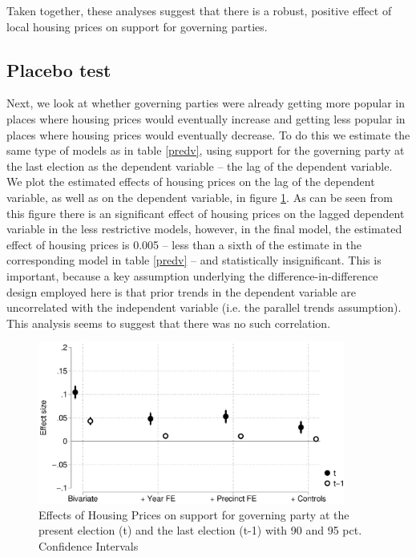 \documentclass[12pt,a4paper]{article}
\begin{document}
Taken together, these analyses suggest that there is a robust, positive effect of local housing prices on support for governing parties.

\subsection{Placebo test}
Next, we look at whether  governing parties were already getting more popular in places where housing prices would eventually increase and getting less popular in places where housing prices would eventually decrease. To do this we estimate the same type of models as in table \ref{predv}, using support for the governing party at the last election as the dependent variable -- the lag of the dependent variable. We plot the estimated effects of housing prices on the lag of the dependent variable, as well as on the dependent variable, in figure \ref{placebo}. As can be seen from this figure there is an significant effect of housing prices on the lagged dependent variable in the less restrictive models, however, in the final model, the estimated effect of housing prices is 0.005 -- less than a sixth of the estimate in the corresponding model in table \ref{predv} -- and statistically insignificant. This is important, because a key assumption underlying the difference-in-difference design employed here is that prior trends in the dependent variable are uncorrelated with the independent variable  (i.e. the parallel trends assumption). This analysis seems to suggest that there was no such correlation.

\begin{figure}[htbp!]
	\includegraphics[width=0.9\textwidth]{../figures/lagdv.eps}
	\centering
	\caption{Effects of Housing Prices on support for governing party at the present election (t) and the last election (t-1) with 90  and 95 pct. Confidence Intervals}\label{placebo}
\end{figure}
\end{document}
